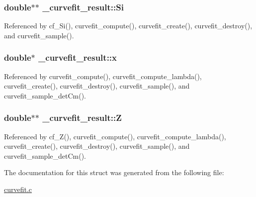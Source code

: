 \subsubsection[{\texorpdfstring{Si}{Si}}]{\setlength{\rightskip}{0pt plus 5cm}double$\ast$$\ast$ \+\_\+curvefit\+\_\+result\+::\+Si}\hypertarget{struct__curvefit__result_a98daa734e4c93414381644b5da332785}{}\label{struct__curvefit__result_a98daa734e4c93414381644b5da332785}


Referenced by cf\+\_\+\+Si(), curvefit\+\_\+compute(), curvefit\+\_\+create(), curvefit\+\_\+destroy(), and curvefit\+\_\+sample().

\subsubsection[{\texorpdfstring{x}{x}}]{\setlength{\rightskip}{0pt plus 5cm}double$\ast$ \+\_\+curvefit\+\_\+result\+::x}\hypertarget{struct__curvefit__result_a07b7d671ead5f402dd53973dd8095d8e}{}\label{struct__curvefit__result_a07b7d671ead5f402dd53973dd8095d8e}


Referenced by curvefit\+\_\+compute(), curvefit\+\_\+compute\+\_\+lambda(), curvefit\+\_\+create(), curvefit\+\_\+destroy(), curvefit\+\_\+sample(), and curvefit\+\_\+sample\+\_\+det\+Cm().

\subsubsection[{\texorpdfstring{Z}{Z}}]{\setlength{\rightskip}{0pt plus 5cm}double$\ast$$\ast$ \+\_\+curvefit\+\_\+result\+::Z}\hypertarget{struct__curvefit__result_a3a16ac20b913a15302777af1c737802e}{}\label{struct__curvefit__result_a3a16ac20b913a15302777af1c737802e}


Referenced by cf\+\_\+\+Z(), curvefit\+\_\+compute(), curvefit\+\_\+compute\+\_\+lambda(), curvefit\+\_\+create(), curvefit\+\_\+destroy(), curvefit\+\_\+sample(), and curvefit\+\_\+sample\+\_\+det\+Cm().



The documentation for this struct was generated from the following file\+:\begin{DoxyCompactItemize}
\item 
\hyperlink{curvefit_8c}{curvefit.\+c}\end{DoxyCompactItemize}
